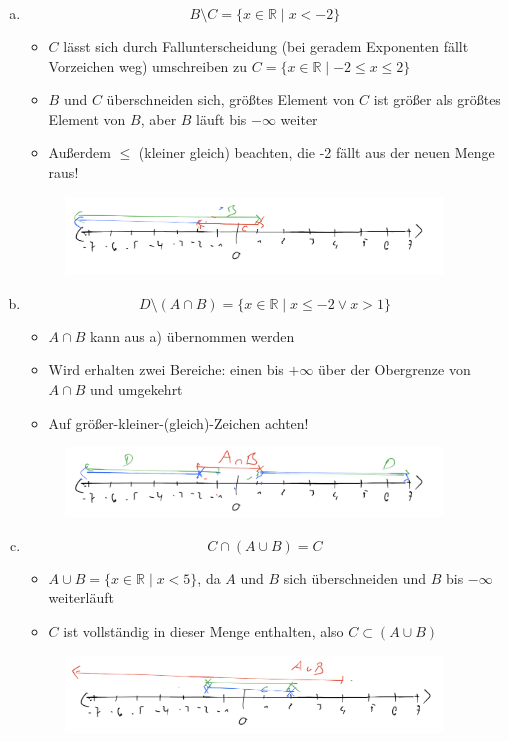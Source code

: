 \documentclass{standalone}
\begin{document}
\begin{enumerate}[a)]
    \item $$ B \setminus C = \{x \in \mathbb{R} \mid x < -2\}$$
    \begin{itemize}
        \item $C$ lässt sich durch Fallunterscheidung (bei geradem Exponenten fällt Vorzeichen weg) umschreiben zu $C = \{x \in \mathbb{R} \mid -2 \leq x \leq 2\}$
        \item $B$ und $C$ überschneiden sich, größtes Element von $C$ ist größer als größtes Element von $B$, aber $B$ läuft bis $-\infty$ weiter
        \item Außerdem $\leq$ (kleiner gleich) beachten, die -2 fällt aus der neuen Menge raus!
    \end{itemize}
    \begin{figure}[htpb]
        \centering
        \includegraphics[width=10cm]{img/2_7_c}
    \end{figure}
    \FloatBarrier

    \item $$D \setminus (A \cap B) =  \{x \in \mathbb{R} \mid x \leq -2 \vee x > 1\}$$
    \begin{itemize}
        \item $A \cap B$ kann aus a) übernommen werden
        \item Wird erhalten zwei Bereiche: einen bis $+\infty$ über der Obergrenze von $A \cap B$ und umgekehrt
        \item Auf größer-kleiner-(gleich)-Zeichen achten!
    \end{itemize}
    \begin{figure}[htpb]
        \centering
        \includegraphics[width=10cm]{img/2_7_d}
    \end{figure}
    \FloatBarrier

    \FloatBarrier
    \item $$C \cap(A \cup B) = C$$
    \begin{itemize}
        \item $A \cup B = \{x \in \mathbb{R} \mid x < 5\}$, da $A$ und $B$ sich überschneiden und $B$ bis $-\infty$ weiterläuft
        \item $C$ ist vollständig in dieser Menge enthalten, also $C \subset (A \cup B)$
    \end{itemize}
    \begin{figure}[htpb]
        \centering
        \includegraphics[width=10cm]{img/2_7_e}
    \end{figure}
    \FloatBarrier


\end{enumerate}
\end{document}
